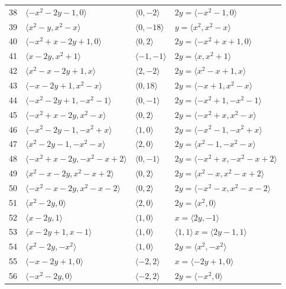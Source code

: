 \documentclass[11pt]{article}
\begin{document}
\begin{longtable}{@{}rlll@{}}
38 & $\langle -x^{2}-2y-1,0\rangle$ & $\langle 0,-2\rangle$ & $2y=\langle -x^{2}-1,0\rangle$\\
39 & $\langle x^{2}-y,x^{2}-x\rangle$ & $\langle 0,-18\rangle$ & $y=\langle x^{2},x^{2}-x\rangle$\\
40 & $\langle -x^{2}+x-2y+1,0\rangle$ & $\langle 0,2\rangle$ & $2y=\langle -x^{2}+x+1,0\rangle$\\
41 & $\langle x-2y,x^{2}+1\rangle$ & $\langle -1,-1\rangle$ & $2y=\langle x,x^{2}+1\rangle$\\
42 & $\langle x^{2}-x-2y+1,x\rangle$ & $\langle 2,-2\rangle$ & $2y=\langle x^{2}-x+1,x\rangle$\\
43 & $\langle -x-2y+1,x^{2}-x\rangle$ & $\langle 0,18\rangle$ & $2y=\langle -x+1,x^{2}-x\rangle$\\
44 & $\langle -x^{2}-2y+1,-x^{2}-1\rangle$ & $\langle 0,-1\rangle$ & $2y=\langle -x^{2}+1,-x^{2}-1\rangle$\\
45 & $\langle -x^{2}+x-2y,x^{2}-x\rangle$ & $\langle 0,2\rangle$ & $2y=\langle -x^{2}+x,x^{2}-x\rangle$\\
46 & $\langle -x^{2}-2y-1,-x^{2}+x\rangle$ & $\langle 1,0\rangle$ & $2y=\langle -x^{2}-1,-x^{2}+x\rangle$\\
47 & $\langle x^{2}-2y-1,-x^{2}-x\rangle$ & $\langle 2,0\rangle$ & $2y=\langle x^{2}-1,-x^{2}-x\rangle$\\
48 & $\langle -x^{2}+x-2y,-x^{2}-x+2\rangle$ & $\langle 0,-1\rangle$ & $2y=\langle -x^{2}+x,-x^{2}-x+2\rangle$\\
49 & $\langle x^{2}-x-2y,x^{2}-x+2\rangle$ & $\langle 0,2\rangle$ & $2y=\langle x^{2}-x,x^{2}-x+2\rangle$\\
50 & $\langle -x^{2}-x-2y,x^{2}-x-2\rangle$ & $\langle 0,2\rangle$ & $2y=\langle -x^{2}-x,x^{2}-x-2\rangle$\\
51 & $\langle x^{2}-2y,0\rangle$ & $\langle 2,0\rangle$ & $2y=\langle x^{2},0\rangle$\\
52 & $\langle x-2y,1\rangle$ & $\langle 1,0\rangle$ & $x=\langle 2y,-1\rangle$\\
53 & $\langle x-2y+1,x-1\rangle$ & $\langle 1,0\rangle$ & $\langle 1,1\rangle\,x=\langle 2y-1,1\rangle$\\
54 & $\langle x^{2}-2y,-x^{2}\rangle$ & $\langle 1,0\rangle$ & $2y=\langle x^{2},-x^{2}\rangle$\\
55 & $\langle -x-2y+1,0\rangle$ & $\langle -2,2\rangle$ & $x=\langle -2y+1,0\rangle$\\
56 & $\langle -x^{2}-2y,0\rangle$ & $\langle -2,2\rangle$ & $2y=\langle -x^{2},0\rangle$\\

\end{longtable}
\end{document}
